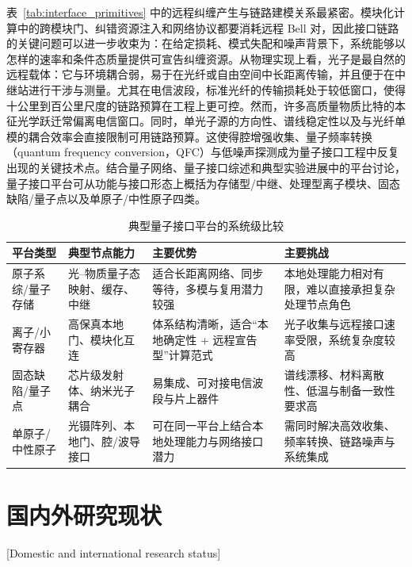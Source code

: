 表~\ref{tab:interface_primitives} 中的远程纠缠产生与链路建模关系最紧密。模块化计算中的跨模块门、纠错资源注入和网络协议都要消耗远程 Bell 对，因此接口链路的关键问题可以进一步收束为：在给定损耗、模式失配和噪声背景下，系统能够以怎样的速率和条件态质量提供可宣告纠缠资源。从物理实现上看，光子是最自然的远程载体：它与环境耦合弱，易于在光纤或自由空间中长距离传输，并且便于在中继站进行干涉与测量\cite{kimble2008quantum,Wehner2018QuantumInternetVision}。尤其在电信波段，标准光纤的传输损耗处于较低窗口，使得十公里到百公里尺度的链路预算在工程上更可控\cite{Wehner2018QuantumInternetVision}。然而，许多高质量物质比特的本征光学跃迁常偏离电信窗口。同时，单光子源的方向性、谱线稳定性以及与光纤单模的耦合效率会直接限制可用链路预算\cite{Reiserer2022CavityEnhancedNetworkNodes,Awschalom2021QuIC}。这使得腔增强收集、量子频率转换（quantum frequency conversion，QFC）与低噪声探测成为量子接口工程中反复出现的关键技术点\cite{Ikuta2018PolarizationInsensitiveQFC,vanleent2022entangling}。结合量子网络\cite{Wehner2018QuantumInternetVision}、量子接口综述\cite{Awschalom2021QuIC,NorthupBlatt2014QuantumInfoTransfer}和典型实验进展\cite{Covey2023QuantumNetworksNeutralAtomNodes,Reiserer2022CavityEnhancedNetworkNodes}中的平台讨论，量子接口平台可从功能与接口形态上概括为存储型/中继、处理型离子模块、固态缺陷/量子点以及单原子/中性原子四类。
\begin{table}[htbp]
\centering
\small
\renewcommand{\arraystretch}{1.25}
\caption{典型量子接口平台的系统级比较}
\label{tab:platform_compare}
\begin{tabular}{p{2.2cm}p{2.7cm}p{4.3cm}p{4.3cm}}
\toprule
平台类型 & 典型节点能力 & 主要优势 & 主要挑战 \\
\midrule
原子系综/量子存储 & 光--物质量子态映射、缓存、中继 & 适合长距离网络、同步等待，多模与复用潜力较强 & 本地处理能力相对有限，难以直接承担复杂处理节点角色 \\
离子/小寄存器 & 高保真本地门、模块化互连 & 体系结构清晰，适合“本地确定性 + 远程宣告型”计算范式 & 光子收集与远程接口速率受限，系统复杂度较高 \\
固态缺陷/量子点 & 芯片级发射体、纳米光子耦合 & 易集成、可对接电信波段与片上器件 & 谱线漂移、材料离散性、低温与制备一致性要求高 \\
单原子/中性原子 & 光镊阵列、本地门、腔/波导接口 & 可在同一平台上结合本地处理能力与网络接口潜力 & 需同时解决高效收集、频率转换、链路噪声与系统集成 \\
\bottomrule
\end{tabular}
\end{table}


\section{国内外研究现状}[Domestic and international research status]

